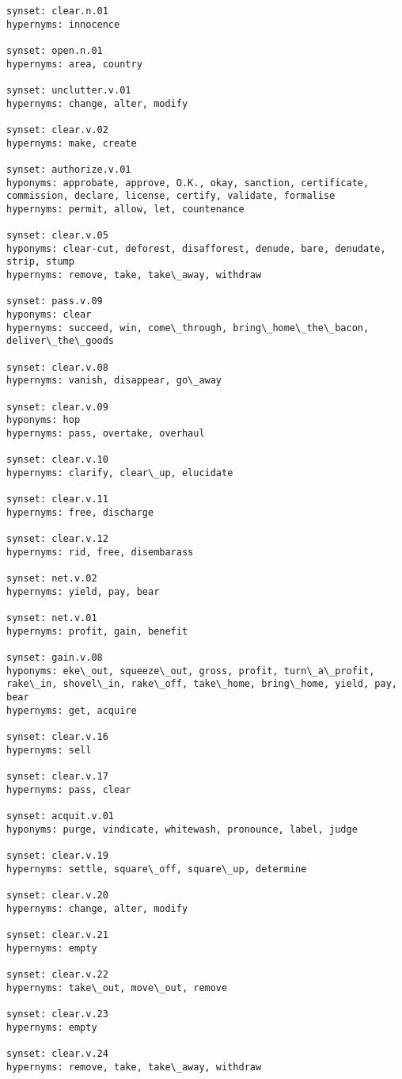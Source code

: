 \begin{multicols}{2}
\begin{verbatim}
synset: clear.n.01
hypernyms: innocence

synset: open.n.01
hypernyms: area, country

synset: unclutter.v.01
hypernyms: change, alter, modify

synset: clear.v.02
hypernyms: make, create

synset: authorize.v.01
hyponyms: approbate, approve, O.K., okay, sanction, certificate, commission, declare, license, certify, validate, formalise
hypernyms: permit, allow, let, countenance

synset: clear.v.05
hyponyms: clear-cut, deforest, disafforest, denude, bare, denudate, strip, stump
hypernyms: remove, take, take\_away, withdraw

synset: pass.v.09
hyponyms: clear
hypernyms: succeed, win, come\_through, bring\_home\_the\_bacon, deliver\_the\_goods

synset: clear.v.08
hypernyms: vanish, disappear, go\_away

synset: clear.v.09
hyponyms: hop
hypernyms: pass, overtake, overhaul

synset: clear.v.10
hypernyms: clarify, clear\_up, elucidate

synset: clear.v.11
hypernyms: free, discharge

synset: clear.v.12
hypernyms: rid, free, disembarass

synset: net.v.02
hypernyms: yield, pay, bear

synset: net.v.01
hypernyms: profit, gain, benefit

synset: gain.v.08
hyponyms: eke\_out, squeeze\_out, gross, profit, turn\_a\_profit, rake\_in, shovel\_in, rake\_off, take\_home, bring\_home, yield, pay, bear
hypernyms: get, acquire

synset: clear.v.16
hypernyms: sell

synset: clear.v.17
hypernyms: pass, clear

synset: acquit.v.01
hyponyms: purge, vindicate, whitewash, pronounce, label, judge

synset: clear.v.19
hypernyms: settle, square\_off, square\_up, determine

synset: clear.v.20
hypernyms: change, alter, modify

synset: clear.v.21
hypernyms: empty

synset: clear.v.22
hypernyms: take\_out, move\_out, remove

synset: clear.v.23
hypernyms: empty

synset: clear.v.24
hypernyms: remove, take, take\_away, withdraw
\end{verbatim}
\end{multicols}

